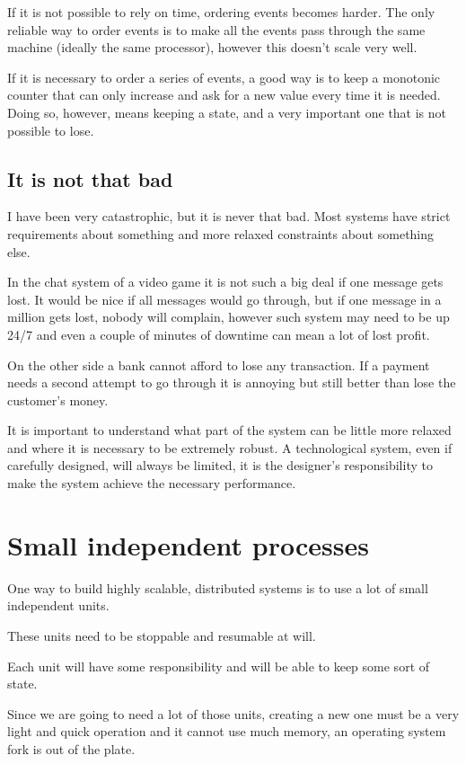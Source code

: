 \documentclass[12pt]{article} %
\begin{document}
If it is not possible to rely on time, ordering events becomes harder. The only reliable way to order events is to make all the events pass through the same machine (ideally the same processor), however this doesn't scale very well.

If it is necessary to order a series of events, a good way is to keep a monotonic counter that can only increase and ask for a new value every time it is needed. Doing so, however, means keeping a state, and a very important one that is not possible to lose.

	\subsection{It is not that bad}

I have been very catastrophic, but it is never that bad. Most systems have strict requirements about something and more relaxed constraints about something else. 

In the chat system of a video game it is not such a big deal if one message gets lost. It would be nice if all messages would go through, but if one message in a million gets lost, nobody will complain, however such system may need to be up 24/7 and even a couple of minutes of downtime can mean a lot of lost profit.

On the other side a bank cannot afford to lose any transaction. If a payment needs a second attempt to go through it is annoying but still better than lose the customer's money.

It is important to understand what part of the system can be little more relaxed and where it is necessary to be extremely robust. A technological system, even if carefully designed, will always be limited, it is the designer's responsibility to make the system achieve the necessary performance.

\section{Small independent processes}

One way to build highly scalable, distributed systems is to use a lot of small independent units.

These units need to be stoppable and resumable at will.

Each unit will have some responsibility and will be able to keep some sort of state.

Since we are going to need a lot of those units, creating a new one must be a very light and quick operation and it cannot use much memory, an operating system fork is out of the plate.
\end{document}
